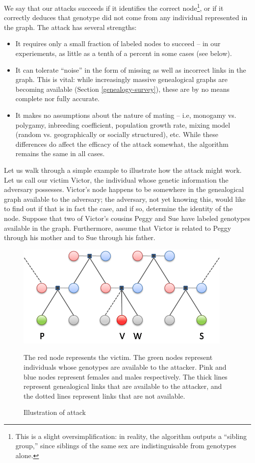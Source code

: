 \documentclass{article}
\begin{document}
We say that our attacks succeeds if it identifies the correct node\footnote{This is a slight oversimplification: in reality, the algorithm outputs a ``sibling group,'' since siblings of the same sex are indistinguisable from genotypes alone.}, or if it correctly deduces that genotype did not come from any individual represented in the graph. The attack has several strengths:
\begin{itemize}
\item
It requires only a small fraction of labeled nodes to succeed -- in our experiements, as little as a tenth of a percent in some cases (see below). 
\item
It can tolerate ``noise'' in the form of missing as well as incorrect links in the graph. This is vital: while increasingly massive genealogical graphs are becoming available (Section \ref{genealogy-survey}), these are by no means complete nor fully accurate.
\item
It makes no assumptions about the nature of mating -- i.e, monogamy vs. polygamy, inbreeding coefficient, population growth rate, mixing model (random vs. geographically or socially structured), etc. While these differences do affect the efficacy of the attack somewhat, the algorithm remains the same in all cases.
\end{itemize}

Let us walk through a simple example to illustrate how the attack might work. Let us call our victim Victor, the individual whose genetic information the adversary possesses.  Victor's node happens to be somewhere in the genealogical graph available to the adversary; the adversary, not yet knowing this, would like to find out if that is in fact the case, and if so, determine the identity of the node. Suppose that two of Victor's cousins Peggy and Sue have labeled genotypes available in the graph. Furthermore, assume that Victor is related to Peggy through his mother and to Sue through his father.  

\begin{figure}[htp]
\begin{center}
\includegraphics[height=2in]{attack-illustration.png}
\end{center}
\caption{Illustration of attack}
\small{
The red node represents the victim. 
The green nodes represent individuals whose genotypes are available to the attacker.
Pink and blue nodes represent females and males respectively.
The thick lines represent genealogical links that are available to the attacker, and the dotted lines represent links that are not available.}
\end{figure}
\end{document}
